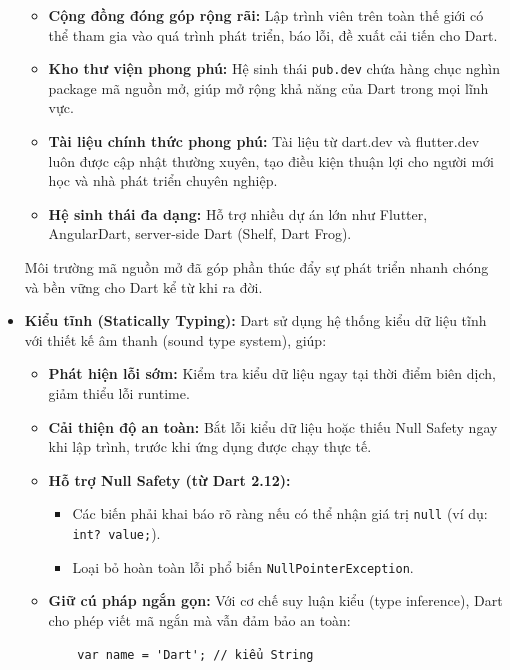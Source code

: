 \documentclass[../DoAn.tex]{subfiles}
\numberwithin{figure}{chapter}
\begin{document}
\begin{itemize}
\begin{itemize}
    \item \textbf{Cộng đồng đóng góp rộng rãi:} Lập trình viên trên toàn thế giới có thể tham gia vào quá trình phát triển, báo lỗi, đề xuất cải tiến cho Dart.
    \item \textbf{Kho thư viện phong phú:} Hệ sinh thái \texttt{pub.dev} chứa hàng chục nghìn package mã nguồn mở, giúp mở rộng khả năng của Dart trong mọi lĩnh vực.
    \item \textbf{Tài liệu chính thức phong phú:} Tài liệu từ dart.dev và flutter.dev luôn được cập nhật thường xuyên, tạo điều kiện thuận lợi cho người mới học và nhà phát triển chuyên nghiệp.
    \item \textbf{Hệ sinh thái đa dạng:} Hỗ trợ nhiều dự án lớn như Flutter, AngularDart, server-side Dart (Shelf, Dart Frog).
\end{itemize}

Môi trường mã nguồn mở đã góp phần thúc đẩy sự phát triển nhanh chóng và bền vững cho Dart kể từ khi ra đời.

\vspace{0.5cm}

\item \textbf{Kiểu tĩnh (Statically Typing):} 
Dart sử dụng hệ thống kiểu dữ liệu tĩnh với thiết kế âm thanh (sound type system), giúp:

\begin{itemize}
    \item \textbf{Phát hiện lỗi sớm:} Kiểm tra kiểu dữ liệu ngay tại thời điểm biên dịch, giảm thiểu lỗi runtime.
    \item \textbf{Cải thiện độ an toàn:} Bắt lỗi kiểu dữ liệu hoặc thiếu Null Safety ngay khi lập trình, trước khi ứng dụng được chạy thực tế.
    \item \textbf{Hỗ trợ Null Safety (từ Dart 2.12):}
    \begin{itemize}
        \item Các biến phải khai báo rõ ràng nếu có thể nhận giá trị \texttt{null} (ví dụ: \texttt{int? value;}).
        \item Loại bỏ hoàn toàn lỗi phổ biến \texttt{NullPointerException}.
    \end{itemize}
    \item \textbf{Giữ cú pháp ngắn gọn:} Với cơ chế suy luận kiểu (type inference), Dart cho phép viết mã ngắn mà vẫn đảm bảo an toàn:
    \begin{verbatim}
    var name = 'Dart'; // kiểu String
    \end{verbatim}
\end{itemize}


\end{itemize}
\end{document}
